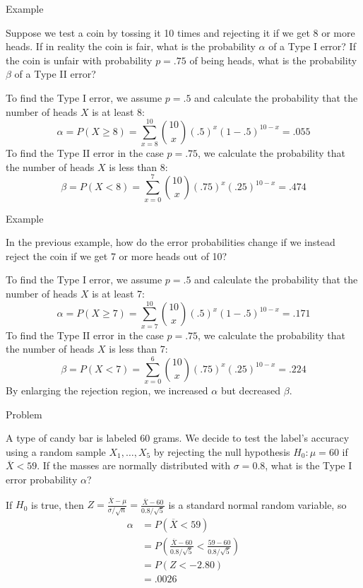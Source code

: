 \documentclass{beamer}
\begin{document}
\begin{frame}{Example}
\begin{block}{}
Suppose we test a coin by tossing it 10 times and rejecting it if we get 8 or more heads. If in reality the coin is fair, what is the probability $\alpha$ of a Type I error? If the coin is unfair with probability $p=.75$ of being heads, what is the probability $\beta$ of a Type II error?
\end{block}
\pause To find the Type I error, we assume $p=.5$ and calculate the probability that the number of heads $X$ is at least 8:
\pause $$\alpha = P(X \geq 8) = \sum_{x=8}^{10} \binom{10} x (.5)^x(1-.5)^{10-x}= .055$$
\pause To find the Type II error in the case $p=.75$, we calculate the probability that the number of heads $X$ is less than 8:
\pause $$\beta = P(X < 8) = \sum_{x=0}^7 \binom{10} x (.75)^x(.25)^{10-x} = .474$$
\end{frame}

\begin{frame}{Example}
\begin{block}{}
In the previous example, how do the error probabilities change if we instead reject the coin if we get 7 or more heads out of 10?
\end{block}
\pause To find the Type I error, we assume $p=.5$ and calculate the probability that the number of heads $X$ is at least 7:
\pause $$\alpha = P(X \geq 7) = \sum_{x=7}^{10} \binom{10} x (.5)^x(1-.5)^{10-x}= .171$$
\pause To find the Type II error in the case $p=.75$, we calculate the probability that the number of heads $X$ is less than 7:
\pause $$\beta = P(X < 7) = \sum_{x=0}^6 \binom{10} x (.75)^x(.25)^{10-x} = .224$$
By enlarging the rejection region, we increased $\alpha$ but decreased $\beta$.
\end{frame}

\begin{frame}{Problem}
\begin{block}{}
A type of candy bar is labeled 60 grams. We decide to test the label's accuracy using a random sample $X_1,\dots,X_5$ by rejecting the null hypothesis $H_0: \mu=60$ if $\overline X<59$. If the masses are normally distributed with $\sigma=0.8$, what is the Type I error probability $\alpha$?
\end{block}

\pause If $H_0$ is true, then $Z=\frac{\overline X-\mu}{\sigma/\sqrt{n}}=\frac{\overline X-60}{0.8/\sqrt5}$ is a standard normal random variable, \pause so
\begin{align*}
\alpha &= P(\overline X<59) \\
&= P\left(\frac{\overline X-60}{0.8/\sqrt5} < \frac{59-60}{0.8/\sqrt5}\right)\\
&= P(Z < -2.80) \\
&= .0026
\end{align*}
\end{frame}
\end{document}
